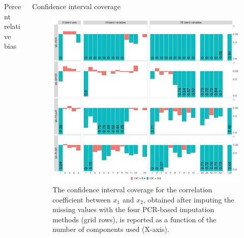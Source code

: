 \documentclass{beamer}\usepackage[]{graphicx}\usepackage[]{xcolor}
\makeatletter
\def\maxwidth{ %
  \ifdim\Gin@nat@width>\linewidth
    \linewidth
  \else
    \Gin@nat@width
  \fi
}
\newenvironment{knitrout}{}{} %
\makeatother
\begin{document}
\begin{frame}[fragile]
\begin{columns}
\begin{column}{.46\textwidth}
\begin{block}{\centering Percent relative bias}
    \end{block}
    
  \end{column}  


  \begin{column}{.46\textwidth}

    \begin{block}{\centering Confidence interval coverage}
      
      \begin{figure}
        \centering
\begin{knitrout}
\color{fgcolor}

{\centering \includegraphics[width=\maxwidth]{figure/plot-cic-1} 

}


\end{knitrout}
          \caption{
            \label{fig:prb} 
            The confidence interval coverage for the correlation coefficient between $x_1$ and $x_2$, obtained after imputing the missing values with the four PCR-based imputation methods (grid rows), is reported as a function of the number of components used (X-axis).
            }
        \end{figure}
    
    \end{block}
    \end{column}


\end{columns}
\end{frame}
\end{document}
